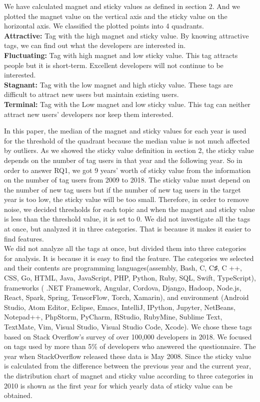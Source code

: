 \documentclass[english,preprint,JIP]{ipsj}
\begin{document}
We have calculated magnet and sticky values as defined in section 2. And we plotted the magnet value on the vertical axis and the sticky value on the horizontal axis. We classified the plotted points into 4 quadrants.\\
\textbf
{Attractive:} Tag with the high magnet and sticky value. By knowing attractive tags, we can find out what the developers are interested in.\\
\textbf{Fluctuating:} Tag with high magnet and low sticky value. This tag attracts people but it is short-term. Excellent developers will not continue to be interested.\\
\textbf{Stagnant:} Tag with the low magnet and high sticky value. These tags are difficult to attract new users but maintain existing users.\\
\textbf{Terminal:} Tag with the Low magnet and low sticky value. This tag can neither attract new users' developers nor keep them interested.
\smallskip
\smallskip

In this paper, the median of the magnet and sticky values for each year is used for the threshold of the quadrant because the median value is not much affected by outliers. As we showed the sticky value definition in section 2, the sticky value depends on the number of tag users in that year and the following year. So in order to answer RQ1, we got 9 years' worth of sticky value from the information on the number of tag users from 2009 to 2018. The sticky value must depend on the number of new tag users but if the number of new tag users in the target year is too low, the sticky value will be too small. Therefore, in order to remove noise, we decided thresholds for each topic and when the magnet and sticky value is less than the threshold value, it is set to 0.
We did not investigate all the tags at once, but analyzed it in three categories. That is because it makes it easier to find features.\\

We did not analyze all the tags at once, but divided them into three categories for analysis. It is because it is easy to find the feature. The categories we selected and their contents are programming languages ​​(assembly, Bash, C, C♯, C ++, CSS, Go, HTML, Java, JavaScript, PHP, Python, Ruby, SQL, Swift, TypeScript), frameworks ( .NET Framework, Angular, Cordova, Django, Hadoop, Node.js, React, Spark, Spring, TensorFlow, Torch, Xamarin), and environment (Android Studio, Atom Editor, Eclipse, Emacs, IntelliJ, IPython, Jupyter, NetBeans, Notepad++, PhpStorm, PyCharm, RStudio, RubyMine, Sublime Text, TextMate, Vim, Visual Studio, Visual Studio Code, Xcode).
We chose these tags based on Stack Overflow's survey of over 100,000 developers in 2018. We focused on tags used by more than 5\% of developers who answered the questionnaire. The year when StackOverflow released these data is May 2008. Since the sticky value is calculated from the difference between the previous year and the current year, the distribution chart of magnet and sticky value according to three categories in 2010 is shown as the first year for which yearly data of sticky value can be obtained.
\end{document}

